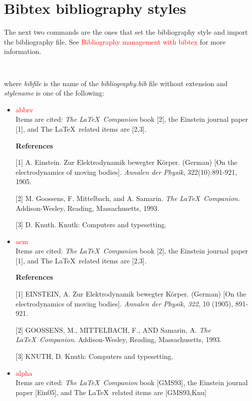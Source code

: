 \section{Bibtex bibliography styles}
The next two commands are the ones that set the bibliography style and import the bibliography file. See \textcolor{red}{Bibliography management with bibtex} for more information.

\begin{lstlisting}[language={[LaTeX]TeX}]


\end{lstlisting}

where \textit{bibfile} is the name of the \textit{bibliography.bib} file without extension and \textit{stylename} is one of the following:

\begin{itemize}
\item \textcolor{red}{abbrv}\\
Items are cited: \textit{The \LaTeX~Companion} book [2], the Einstein journal paper [1], and The \LaTeX~related items are [2,3].

\textbf{References} 

[1] A. Einstein. Zur Elektrodynamik bewegter K\"{o}rper. (German) [On the electrodynamics of moving bodies]. \textit{Annalen der Physik}, 322(10):891-921, 1905.

[2] M. Goossens, F. Mittelbach, and A. Samarin. \textit{The \LaTeX~Companion}. Addison-Wesley, Reading, Massachusetts, 1993.

[3] D. Knuth. Knuth: Computers and typesetting.

\item \textcolor{red}{acm}\\
Items are cited: \textit{The \LaTeX~Companion} book [2], the Einstein journal paper [1], and The \LaTeX~related items are [2,3].

\textbf{References}

[1] EINSTEIN, A. Zur Elektrodynamik bewegter K\"{o}rper. (German) [On the electrodynamics of moving bodies]. \textit{Annalen der Physik, 322}, 10 (1905), 891-921.

[2] GOOSSENS, M., MITTELBACH, F., AND Samarin, A. \textit{The \LaTeX~Companion}. Addison-Wesley, Reading, Massachusetts, 1993.

[3] KNUTH, D. Knuth: Computers and typesetting.

\item \textcolor{red}{alpha} \\
Items are cited: \textit{The \LaTeX~Companion} book [GMS93], the Einstein journal paper [Ein05], and The \LaTeX~related items are [GMS93,Knu]


\end{itemize}
